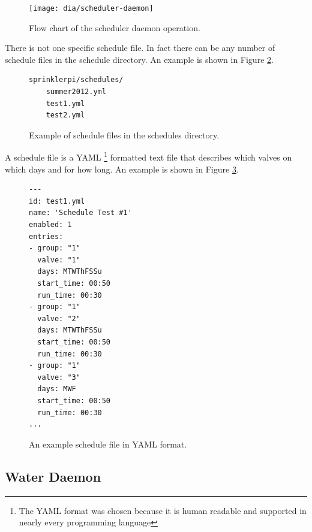 \documentclass{article}
\begin{document}
\begin{figure}[htbp!]
\begin{center}
\texttt{[image: dia/scheduler-daemon]}
\end{center}
\caption{Flow chart of the scheduler daemon operation.}
\label{fig:scheduler-daemon}
\end{figure}

There is not one specific schedule file.
In fact there can be any number of schedule files in the
schedule directory.
An example is shown in Figure \ref{fig:schedfiles}.

\begin{figure}[h!]
\begin{center}
\begin{minipage}{2in}
\begin{verbatim}
sprinklerpi/schedules/
    summer2012.yml
    test1.yml
    test2.yml
\end{verbatim}
\end{minipage}
\end{center}
\caption{Example of schedule files in the schedules directory.}
\label{fig:schedfiles}
\end{figure}

\clearpage
A schedule file is a YAML\autocite{yaml}
\footnote{The YAML format was chosen because it is human readable
and supported in nearly every programming language}
formatted text file that describes
which valves on which days and for how long.
An example is shown in Figure \ref{fig:yamlsched}.

\begin{figure}[h!]
\begin{center}
\begin{minipage}{3in}
\begin{verbatim}
---
id: test1.yml
name: 'Schedule Test #1'
enabled: 1
entries:
- group: "1"
  valve: "1"
  days: MTWThFSSu
  start_time: 00:50
  run_time: 00:30
- group: "1"
  valve: "2"
  days: MTWThFSSu
  start_time: 00:50
  run_time: 00:30
- group: "1"
  valve: "3"
  days: MWF
  start_time: 00:50
  run_time: 00:30
...
\end{verbatim}
\end{minipage}
\end{center}
\caption{An example schedule file in YAML format.}
\label{fig:yamlsched}
\end{figure}



\clearpage
\FloatBarrier
\subsection{Water Daemon}
\label{sec:waterd}
\end{document}
